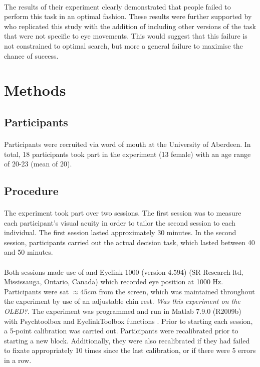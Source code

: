 \documentclass[12pt]{article}
\begin{document}
\paragraph{} The results of their experiment clearly demonstrated that people failed to perform this task in an optimal fashion. These results were further supported by \cite{clarke2015failure} who replicated this study with the addition of including other versions of the task that were not specific to eye movements. This would suggest that this failure is not constrained to optimal search, but more a general failure to maximise the chance of success. 

\section*{Methods}

\subsection*{Participants}
\paragraph{} Participants were recruited via word of mouth at the University of Aberdeen. In total, 18 participants took part in the experiment (13 female) with an age range of 20-23 (mean of 20). 

\subsection*{Procedure}
\paragraph{} The experiment took part over two sessions. The first session was to measure each participant's visual acuity in order to tailor the second session to each individual. The first session lasted approximately 30 minutes. In the second session, participants carried out the actual decision task, which lasted between 40 and 50 minutes. 

\paragraph{} Both sessions made use of and Eyelink 1000 (version 4.594) (SR Research ltd, Mississauga, Ontario, Canada) which recorded eye position at 1000 Hz. Participants were sat $\approx45cm$ from the screen, which was maintained throughout the experiment by use of an adjustable chin rest. \textit{Was this experiment on the OLED?}. The experiment was programmed and run in Matlab 7.9.0 (R2009b) with Psychtoolbox \citep{pelli1997videotoolbox} and EyelinkToolbox functions \citep{cornelissen2002eyelink}. Prior to starting each session, a 5-point calibration was carried out. Participants were recalibrated prior to starting a new block. Additionally, they were also recalibrated if they had failed to fixate appropriately 10 times since the last calibration, or if there were 5 errors in a row.
\end{document}
